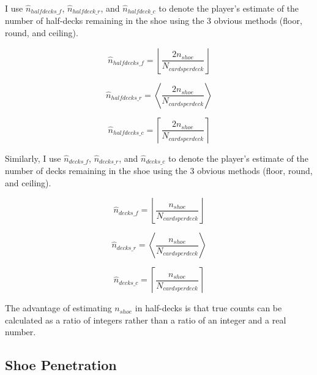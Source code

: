 I use $\hat{n}_{halfdecks\_f}$, $\hat{n}_{halfdeck\_r}$, and 
$\hat{n}_{halfdeck\_c}$ to denote the player's estimate of the number of
half-decks remaining in the shoe using the 3 obvious methods (floor, round, and ceiling).

\begin{equation}
\label{eq:cmct0:sctp0:npes0:03a}
\hat{n}_{halfdecks\_f} = \left\lfloor \frac{2 n_{shoe}}{N_{cardsperdeck}} \right\rfloor
\end{equation}

\begin{equation}
\label{eq:cmct0:sctp0:npes0:03b}
\hat{n}_{halfdecks\_r} = \left\langle \frac{2 n_{shoe}}{N_{cardsperdeck}} \right\rangle
\end{equation}

\begin{equation}
\label{eq:cmct0:sctp0:npes0:03c}
\hat{n}_{halfdecks\_c} = \left\lceil \frac{2 n_{shoe}}{N_{cardsperdeck}} \right\rceil
\end{equation}

Similarly, I use $\hat{n}_{decks\_f}$, $\hat{n}_{decks\_r}$, and $\hat{n}_{decks\_c}$
to denote the player's estimate of the number of
decks remaining in the shoe using the 3 obvious methods (floor, round, and ceiling).

\begin{equation}
\label{eq:cmct0:sctp0:npes0:04a}
\hat{n}_{decks\_f} = \left\lfloor \frac{n_{shoe}}{N_{cardsperdeck}} \right\rfloor
\end{equation}

\begin{equation}
\label{eq:cmct0:sctp0:npes0:04b}
\hat{n}_{decks\_r} = \left\langle \frac{n_{shoe}}{N_{cardsperdeck}} \right\rangle
\end{equation}

\begin{equation}
\label{eq:cmct0:sctp0:npes0:04c}
\hat{n}_{decks\_c} = \left\lceil \frac{n_{shoe}}{N_{cardsperdeck}} \right\rceil
\end{equation}

The advantage of estimating $n_{shoe}$ in half-decks is that true counts
can be calculated as a ratio of integers rather than a ratio of an integer and
a real number.


\subsection{Shoe Penetration}
\label{cmct0:sctp0:nspn0}

